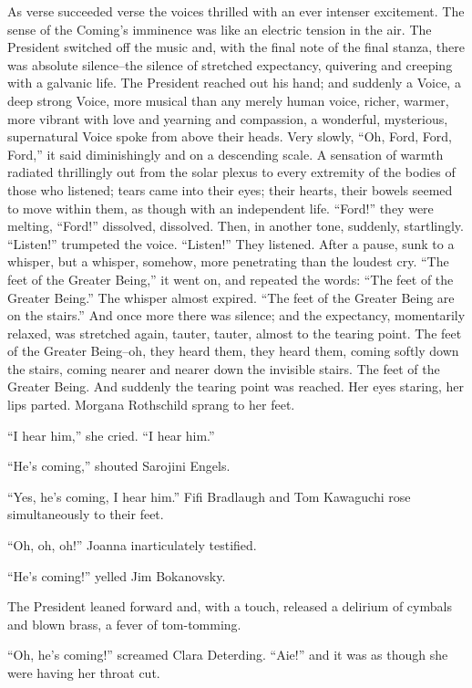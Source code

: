 \documentclass[12pt]{report}
\begin{document}
As verse succeeded verse the voices thrilled with an ever intenser
excitement. The sense of the Coming's imminence was like an electric
tension in the air. The President switched off the music and, with the
final note of the final stanza, there was absolute silence--the silence
of stretched expectancy, quivering and creeping with a galvanic life.
The President reached out his hand; and suddenly a Voice, a deep strong
Voice, more musical than any merely human voice, richer, warmer, more
vibrant with love and yearning and compassion, a wonderful, mysterious,
supernatural Voice spoke from above their heads. Very slowly, ``Oh,
Ford, Ford, Ford,'' it said diminishingly and on a descending scale. A
sensation of warmth radiated thrillingly out from the solar plexus to
every extremity of the bodies of those who listened; tears came into
their eyes; their hearts, their bowels seemed to move within them, as
though with an independent life. ``Ford!'' they were melting, ``Ford!''
dissolved, dissolved. Then, in another tone, suddenly, startlingly.
``Listen!'' trumpeted the voice. ``Listen!'' They listened. After a
pause, sunk to a whisper, but a whisper, somehow, more penetrating than
the loudest cry. ``The feet of the Greater Being,'' it went on, and
repeated the words: ``The feet of the Greater Being.'' The whisper
almost expired. ``The feet of the Greater Being are on the stairs.'' And
once more there was silence; and the expectancy, momentarily relaxed,
was stretched again, tauter, tauter, almost to the tearing point. The
feet of the Greater Being--oh, they heard them, they heard them, coming
softly down the stairs, coming nearer and nearer down the invisible
stairs. The feet of the Greater Being. And suddenly the tearing point
was reached. Her eyes staring, her lips parted. Morgana Rothschild
sprang to her feet.

``I hear him,'' she cried. ``I hear him.''

``He's coming,'' shouted Sarojini Engels.

``Yes, he's coming, I hear him.'' Fifi Bradlaugh and Tom Kawaguchi rose
simultaneously to their feet.

``Oh, oh, oh!'' Joanna inarticulately testified.

``He's coming!'' yelled Jim Bokanovsky.

The President leaned forward and, with a touch, released a delirium of
cymbals and blown brass, a fever of tom-tomming.

``Oh, he's coming!'' screamed Clara Deterding. ``Aie!'' and it was as
though she were having her throat cut.
\end{document}
